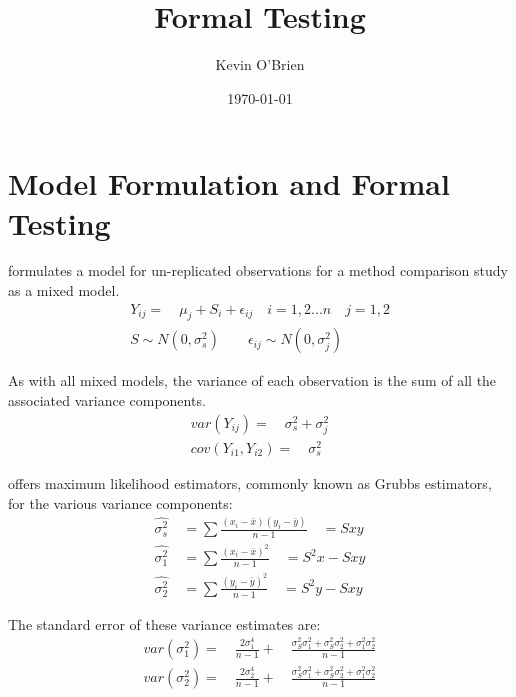 \documentclass[12pt, a4paper]{article}
\begin{document}
\author{Kevin O'Brien}
\title{Formal Testing}


\tableofcontents \setcounter{tocdepth}{2}
\date{\today}
\maketitle


\section{Model Formulation and Formal Testing}

\citet{Kinsella} formulates a model for un-replicated observations
for a method comparison study as a mixed model.
\begin{eqnarray}
Y_{ij} =\quad \mu_{j} + S_{i} + \epsilon_{ij} \quad i=1,2...n\quad
j=1,2\\
S \sim N(0,\sigma^{2}_{s})\qquad \epsilon_{ij} \sim
N(0,\sigma^{2}_{j}) \nonumber
\end{eqnarray}

As with all mixed models, the variance of each observation is the
sum of all the associated variance components.
\begin{eqnarray}
var(Y_{ij}) =\quad \sigma^{2}_{s} + \sigma^{2}_{j} \\
cov(Y_{i1},Y_{i2})=\quad \sigma^{2}_{s} \nonumber
\end{eqnarray}

\citet{Grubbs48} offers maximum likelihood estimators, commonly
known as Grubbs estimators, for the various variance components:
\begin{eqnarray}
\hat{\sigma^{2}_{s}} \quad= \sum{\frac{(x_{i}-\bar{x})(y_{i}-\bar{y})}{n-1}}\quad=Sxy\\
\hat{\sigma^{2}_{1}} \quad= \sum{\frac{(x_{i}-\bar{x})^{2}}{n-1}} \quad=S^{2}x-Sxy \nonumber\\
\hat{\sigma^{2}_{2}} \quad=
\sum{\frac{(y_{i}-\bar{y})^{2}}{n-1}}\quad=S^{2}y-Sxy \nonumber
\nonumber
\end{eqnarray}

The standard error of these variance estimates are:
\begin{eqnarray}
var(\sigma^{2}_{1}) =\quad \frac{2\sigma^{4}_{1}}{n-1} +\quad
\frac{\sigma^2_{S}\sigma^2_{1}+\sigma^2_{S}\sigma^2_{2}+\sigma^2_{1}\sigma^2_{2}
}{n-1}\\
var(\sigma^{2}_{2}) =\quad \frac{2\sigma^{4}_{2}}{n-1} +\quad
\frac{\sigma^2_{S}\sigma^2_{1}+\sigma^2_{S}\sigma^2_{2}+\sigma^2_{1}\sigma^2_{2}
}{n-1}\nonumber
\end{eqnarray}
\end{document}
